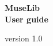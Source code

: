\pagecolor{purple}
\begin{titlepage}
    \begin{center}
        \vspace*{1cm}
        \Huge
        \textbf{MuseLib\\\Large User guide}
        
        \vspace{0.5cm}
        
        \normalsize
        version 1.0
        \vfill
        
    \end{center}
\end{titlepage}
